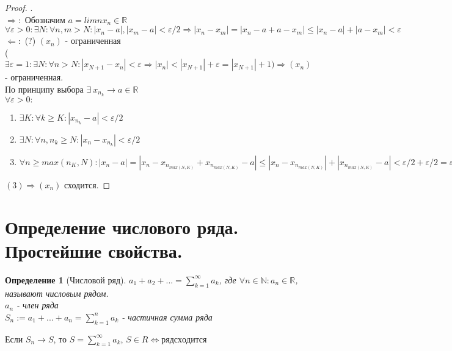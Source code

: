 \documentclass[11pt,a4paper,titlepage]{article}
\newtheorem*{definition}{Определение}
\renewcommand{\implies}{\Rightarrow}
\newcommand{\bimplies}{\Leftarrow}
\renewcommand{\iff}{\Leftrightarrow}
\renewcommand{\epsilon}{\varepsilon}
\newcommand{\R}{\mathbb{R}}
\newcommand{\N}{\mathbb{N}}
\begin{document}
    \begin{proof}
        .\\
        $\implies:$ Обозначим $a = limn x_n \in \R$\\
        $\forall \epsilon > 0: \exists N: \forall n, m > N: |x_n - a|, |x_m - a| < \epsilon/2 \implies |x_n-x_m|=|x_n-a+a-x_m|\leq|x_n-a|+|a-x_m| < \epsilon$\\
        $\bimplies:$ (?) $(x_n)$ - ограниченная\\
        ($\exists \epsilon = 1: \exists N: \forall n > N: |x_{N+1} - x_n| < \epsilon \implies |x_n| < |x_{N+1}| + \epsilon = |x_{N+1}| + 1) \implies (x_n)$ - ограниченная.\\
        По принципу выбора $\exists\ x_{n_k} \to a \in \R$\\
        $\forall \epsilon > 0:$
        \begin{enumerate}
            \item $\exists K: \forall k \geq K: |x_{n_k}-a| < \epsilon/2$
            \item $\exists N: \forall n, n_k \geq N: |x_n - x_{n_k}| < \epsilon/2$
            \item $\forall n \geq max(n_K, N): |x_n - a| = |x_n - x_{n_{max(N, K)}} + x_{n_{max(N, K)}} - a| \leq |x_n - x_{n_{max(N, K)}}| + |x_{n_{max(N, K)}} - a| < \epsilon/2 + \epsilon/2 = \epsilon$
        \end{enumerate}
        $(3) \implies (x_n)$ сходится.
    \end{proof}


    \section{Определение числового ряда. Простейшие свойства.}

    \begin{definition}[Числовой ряд]
        $a_1 + a_2 + ... = \sum_{k=1}^\infty a_k$, где $\forall n \in \N: a_n \in \R$, называют числовым рядом.\\
        $a_n$ - член ряда\\
        $S_n := a_1 + ... + a_n = \sum_{k=1}^n a_k$ - частичная сумма ряда
    \end{definition}

    Если $S_n \to S$, то $S = \sum_{k=1}^\infty a_k$, $S \in R \iff ряд сходится$\\
\end{document}
